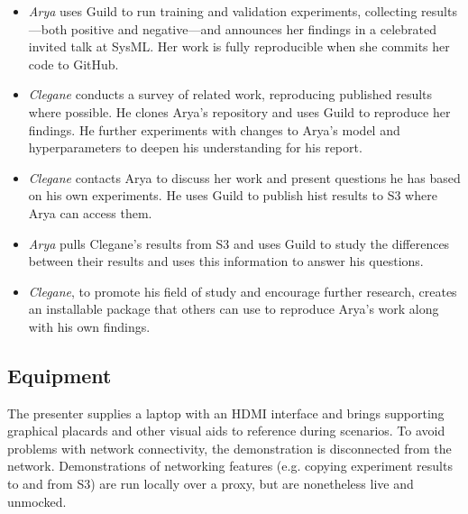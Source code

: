 \documentclass{article}
\begin{document}
\begin{itemize}[topsep=0pt, itemsep=0pt]
\item \emph{Arya} uses Guild to run training and validation
  experiments, collecting results---both positive and negative---and
  announces her findings in a celebrated invited talk at SysML. Her
  work is fully reproducible when she commits her code to GitHub.

\item \emph{Clegane} conducts a survey of related work, reproducing
  published results where possible. He clones Arya's repository and
  uses Guild to reproduce her findings. He further experiments with
  changes to Arya's model and hyperparameters to deepen his
  understanding for his report.

\item \emph{Clegane} contacts Arya to discuss her work and present
  questions he has based on his own experiments. He uses Guild to
  publish hist results to S3 where Arya can access them.

\item \emph{Arya} pulls Clegane's results from S3 and uses Guild to
  study the differences between their results and uses this
  information to answer his questions.

\item \emph{Clegane}, to promote his field of study and encourage
  further research, creates an installable package that others can use
  to reproduce Arya's work along with his own findings.
\end{itemize}

\subsection{Equipment}

The presenter supplies a laptop with an HDMI interface and brings
supporting graphical placards and other visual aids to reference
during scenarios. To avoid problems with network connectivity, the
demonstration is disconnected from the network. Demonstrations of
networking features (e.g. copying experiment results to and from S3)
are run locally over a proxy, but are nonetheless live and unmocked.



\end{document}
